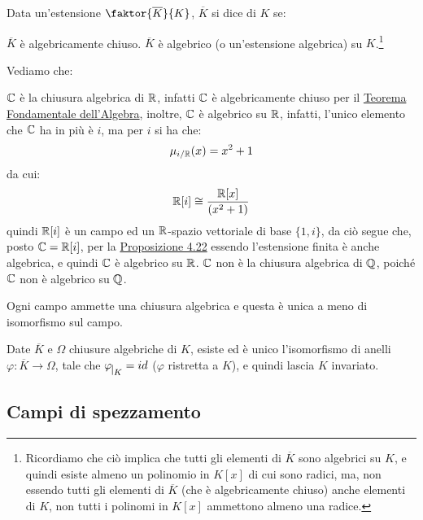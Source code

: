 \documentclass[11pt]{scrartcl}
\begin{document}
\begin{definition}
Data un'estensione $\faktor{\overline K}{K}$, $\overline K$ si dice  di $K$ se:
	\begin{itemize}
	\ii $\overline K$ è algebricamente chiuso.
	\ii $\overline K$ è algebrico (o un'estensione algebrica) su $K$.\footnote{Ricordiamo che ciò implica che tutti gli elementi di $\overline K$ sono algebrici su $K$, e quindi esiste almeno un polinomio in $K[x]$ di cui sono radici, ma, non essendo tutti gli elementi di $\overline K$ (che è algebricamente chiuso) anche elementi di $K$, non tutti i polinomi in $K[x]$ ammettono almeno una radice.}
	\end{itemize}
\end{definition}

\begin{example}
Vediamo che:
	\begin{enumerate}[(1)]
	\ii $\mathbb C$ è la chiusura algebrica di $\mathbb R$, infatti $\mathbb C$ è algebricamente chiuso per il \hyperref[p:tf]{Teorema Fondamentale dell'Algebra}, inoltre, $\mathbb C$ è algebrico su $\mathbb R$, infatti, l'unico elemento che $\mathbb C$ ha in più è $i$, ma per $i$ si ha che:
		\[ \mu_{i/\mathbb R}(x) = x^2 + 1
		\]
		da cui:
			\[ \mathbb R[i] \cong \frac{\mathbb R[x]}{(x^2+1)}
			\]
		quindi $\mathbb R[i]$ è un campo ed un $\mathbb R$-spazio vettoriale di base $\{1,i\}$, da ciò segue che, posto $\mathbb C = \mathbb R[i]$, per la \hyperref[es:4.22]{Proposizione 4.22} essendo l'estensione finita è anche algebrica, e quindi $\mathbb C$ è algebrico su $\mathbb R$.
	\ii $\mathbb C$ non è la chiusura algebrica di $\mathbb Q$, poiché $\mathbb C$ non è algebrico su $\mathbb Q$.
	\end{enumerate}
\end{example}

\begin{theorem}
Ogni campo ammette una chiusura algebrica e questa è unica a meno di isomorfismo sul campo.
\end{theorem}
Date $\overline K$ e $\Omega$ chiusure algebriche di $K$, esiste ed è unico l'isomorfismo di anelli $\varphi: \overline K \longrightarrow \Omega$, tale che $ \varphi_{\mkern 1mu \vrule height 2ex\mkern2mu K} = id$ ($\varphi$ ristretta a $K$), e quindi lascia $K$ invariato.

\newpage
\subsection{Campi di spezzamento}
\end{document}
